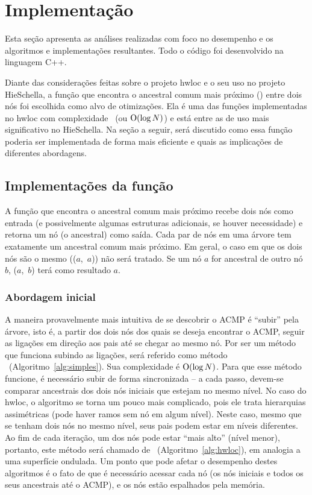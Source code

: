 \chapter{Implementação}
\label{cap:implementacao}

Esta seção apresenta as análises realizadas com foco no desempenho e os algoritmos e implementações resultantes.
Todo o código foi desenvolvido na linguagem C++.

Diante das considerações feitas sobre o projeto hwloc e o seu uso no projeto HieSchella, a função que encontra o ancestral comum mais próximo (\fACMP) entre dois nós foi escolhida como alvo de otimizações.
Ela é uma das funções implementadas no hwloc com complexidade \Oalt\ (ou $\operatorname{O}(\log N)$) e está entre as de uso mais significativo no HieSchella.
Na seção a seguir, será discutido como essa função poderia ser implementada de forma mais eficiente e quais as implicações de diferentes abordagens.


\section{Implementações da função \fACMP}

A função que encontra o ancestral comum mais próximo recebe dois nós como entrada (e possivelmente algumas estruturas adicionais, se houver necessidade)
e retorna um nó (o ancestral) como saída.
Cada par de nós em uma árvore tem exatamente um ancestral comum mais próximo.
Em geral, o caso em que os dois nós são o mesmo (\fACMP($a$,~$a$)) não será tratado.
Se um nó $a$ for ancestral de outro nó $b$, \fACMP($a$,~$b$) terá como resultado $a$.

\subsection{Abordagem inicial}

A maneira provavelmente mais intuitiva de se descobrir o ACMP é ``subir'' pela árvore, isto é, a partir dos dois nós dos quais se deseja encontrar o ACMP,
seguir as ligações em direção aos pais até se chegar ao mesmo nó.
Por ser um método que funciona subindo as ligações, será referido como método \Simples\ (Algoritmo~\ref{alg:simples}).
Sua complexidade é $\operatorname{O}(\log N)$.
Para que esse método funcione, é necessário subir de forma sincronizada -- a cada passo, devem-se comparar ancestrais dos dois nós iniciais que estejam no mesmo nível.
No caso do hwloc, o algoritmo se torna um pouco mais complicado, pois ele trata hierarquias assimétricas (pode haver ramos sem nó em algum nível).
Neste caso, mesmo que se tenham dois nós no mesmo nível, seus pais podem estar em níveis diferentes.
Ao fim de cada iteração, um dos nós pode estar ``mais alto'' (nível menor), portanto, este método será chamado de \Hwloc\ (Algoritmo~\ref{alg:hwloc}), em analogia a uma superfície ondulada.
Um ponto que pode afetar o desempenho destes algoritmos é o fato de que é necessário acessar cada nó
(os nós iniciais e todos os seus ancestrais até o ACMP), e os nós estão espalhados pela memória.

